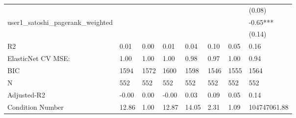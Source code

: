 \begin{table}
\begin{center}
\begin{tabular}{llllllll}
                                      &          &            &         &         &          &                    & (0.08)        \\
user1_satoshi_pagerank_weighted       &          &            &         &         &          &                    & -0.65***      \\
                                      &          &            &         &         &          &                    & (0.14)        \\
R2                                    & 0.01     & 0.00       & 0.01    & 0.04    & 0.10     & 0.05               & 0.16          \\
ElasticNet CV MSE:                    & 1.00     & 1.00       & 1.00    & 0.98    & 0.97     & 1.00               & 0.94          \\
BIC                                   & 1594     & 1572       & 1600    & 1598    & 1546     & 1555               & 1564          \\
N                                     & 552      & 552        & 552     & 552     & 552      & 552                & 552           \\
Adjusted-R2                           & -0.00    & 0.00       & -0.00   & 0.03    & 0.09     & 0.05               & 0.14          \\
Condition Number                      & 12.86    & 1.00       & 12.87   & 14.05   & 2.31     & 1.09               & 104747061.88  \\
\hline
\end{tabular}
\end{center}
\end{table}